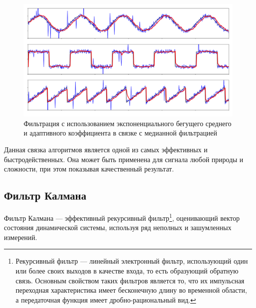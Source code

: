 \begin{figure}[h]
	\begin{center}
		\includegraphics[pages=-, scale=0.33]{./inc/img/7.png}
		\caption{Фильтрация с использованием экспоненциального бегущего среднего и адаптивного коэффициента в связке с медианной фильтрацией}  
		\label{img_7}
	\end{center}
\end{figure}

Данная связка алгоритмов является одной из самых эффективных и быстродейственных. Она может быть применена для сигнала любой природы и сложности, при этом показывая качественный результат.

\newpage

\subsection{Фильтр Калмана}

Фильтр Калмана --- эффективный рекурсивный фильтр\footnote{ Рекурсивный фильтр --- линейный электронный фильтр, использующий один или более своих выходов в качестве входа, то есть образующий обратную связь. Основным свойством таких фильтров является то, что их импульсная переходная характеристика имеет бесконечную длину во временной области, а передаточная функция имеет дробно-рациональный вид.}, оценивающий вектор состояния динамической системы, используя ряд неполных и зашумленных измерений. \cite{calman1}


